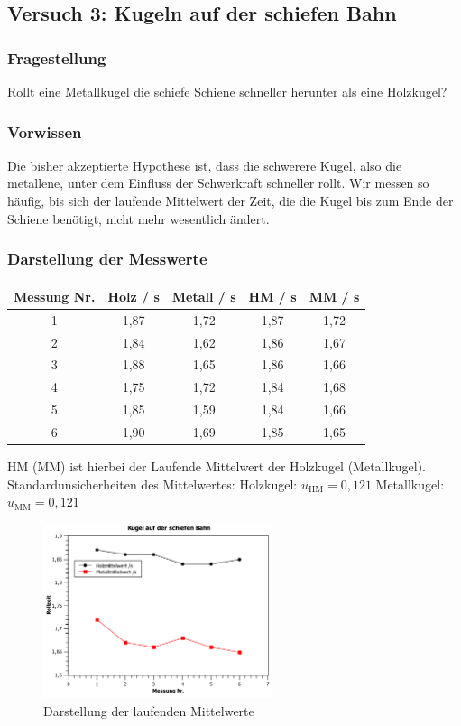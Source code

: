 \documentclass[
	a4paper,
	12pt,
	pagesize,
	ngerman
]{scrartcl}
\begin{document}
	\subsection{Versuch 3: Kugeln auf der schiefen Bahn}
	\subsubsection{Fragestellung}
	Rollt eine Metallkugel die schiefe Schiene schneller herunter als eine Holzkugel?
	\subsubsection{Vorwissen}
	Die bisher akzeptierte Hypothese ist, dass die schwerere Kugel, also die metallene, unter dem Einfluss der Schwerkraft schneller rollt. Wir messen so häufig, bis sich der laufende Mittelwert der Zeit, die die Kugel bis zum Ende der Schiene benötigt, nicht mehr wesentlich ändert.
	\subsubsection{Darstellung der Messwerte}
	
	\begin{tabular}{| c | c | c | c | c |} \hline
		Messung Nr. & Holz  / \si{s} & Metall  / \si{s} & HM  / \si{s} & MM  / \si{s}\\ \hline
		1 & 1,87&1,72&1,87&1,72\\
		2 & 1,84&1,62&1,86&1,67\\
		3 & 1,88&1,65&1,86&1,66\\
		4 & 1,75&1,72&1,84&1,68\\
		5 & 1,85&1,59&1,84&1,66\\
		6 & 1,90&1,69&1,85&1,65\\
		\hline
	\end{tabular}
	\newline
	HM (MM) ist hierbei der Laufende Mittelwert der Holzkugel (Metallkugel). \newline
	Standardunsicherheiten des Mittelwertes: \newline
	Holzkugel: $u_\text{HM}=0,121$ \newline
	Metallkugel: $u_\text{MM}=0,121$
	
	\begin{figure}[htb]
	  \centering
	    \includegraphics[width=0.6\textwidth]{Kugel_auf_schiefer_Bahn} %
	  \caption{Darstellung der laufenden Mittelwerte}
	\end{figure}
\end{document}
